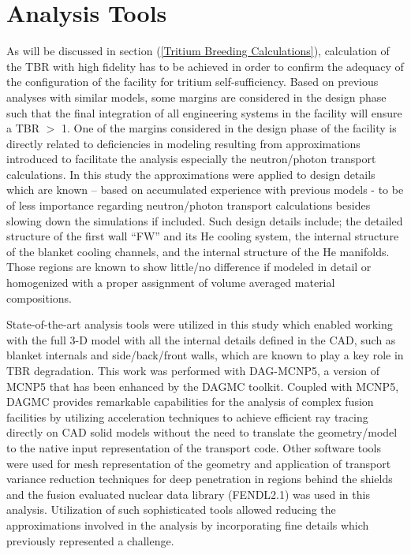 \documentclass[12pt, letterpaper]{elsarticle}
\begin{document}
\section{Analysis Tools} \label{Analysis Tools}
As will be discussed in section (\ref{Tritium Breeding Calculations}), calculation of the TBR with high fidelity has to be achieved in order to confirm the adequacy of the configuration of the facility for tritium self-sufficiency. Based on previous analyses with similar models, some margins are considered in the design phase such that the final integration of all engineering systems in the facility will ensure a TBR $>$ 1. One of the margins \cite{ref_4} considered in the design phase of the facility is directly related to deficiencies in modeling resulting from approximations introduced to facilitate the analysis especially the neutron/photon transport calculations. In this study the approximations were applied to design details which are known – based on accumulated experience with previous models - to be of less importance regarding neutron/photon transport calculations besides slowing down the simulations if included. Such design details include; the detailed structure of the first wall “FW” and its He cooling system, the internal structure of the blanket cooling channels, and the internal structure of the He manifolds. Those regions are known to show little/no difference if modeled in detail or homogenized with a proper assignment of volume averaged material compositions.\vspace{5mm}

State-of-the-art analysis tools were utilized in this study which enabled working with the full 3-D model with all the internal details defined in the CAD, such as blanket internals and side/back/front walls, which are known to play a key role in TBR degradation. This work was performed with DAG-MCNP5, a version of MCNP5 \cite{ref_5} that has been enhanced by the DAGMC \cite{ref_6} toolkit. Coupled with MCNP5, DAGMC provides remarkable capabilities for the analysis of complex fusion facilities by utilizing acceleration techniques to achieve efficient ray tracing directly on CAD solid models without the need to translate the geometry/model to the native input representation of the transport code. Other software tools were used for mesh representation of the geometry and application of transport variance reduction techniques for deep penetration in regions behind the shields and the fusion evaluated nuclear data library (FENDL2.1)\cite{ref_7} was used in this analysis. Utilization of such sophisticated tools allowed reducing the approximations involved in the analysis by incorporating fine details which previously represented a challenge.\vspace{5mm}
\end{document}
